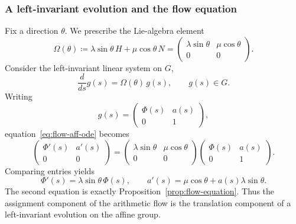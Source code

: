 \subsubsection*{A left-invariant evolution and the flow equation}
Fix a direction $\theta$. We prescribe the Lie-algebra element
\begin{equation}\label{eq:flow-omega}
\Omega(\theta)\coloneqq \lambda\sin\theta\,H+\mu\cos\theta\,N
=
\begin{pmatrix}
\lambda\sin\theta & \mu\cos\theta\\
0 & 0
\end{pmatrix}.
\end{equation}
Consider the left-invariant linear system on $G$,
\begin{equation}\label{eq:flow-aff-ode}
\frac{d}{ds}g(s)=\Omega(\theta)\,g(s),
\qquad g(s)\in G.
\end{equation}
Writing
\[
g(s)=
\begin{pmatrix}
\Phi(s) & a(s)\\
0 & 1
\end{pmatrix},
\]
equation~\eqref{eq:flow-aff-ode} becomes
\[
\begin{pmatrix}
\Phi'(s) & a'(s)\\
0 & 0
\end{pmatrix}
=
\begin{pmatrix}
\lambda\sin\theta & \mu\cos\theta\\
0 & 0
\end{pmatrix}
\begin{pmatrix}
\Phi(s) & a(s)\\
0 & 1
\end{pmatrix}.
\]
Comparing entries yields
\[
\Phi'(s)=\lambda\sin\theta\,\Phi(s),
\qquad
a'(s)=\mu\cos\theta+a(s)\lambda\sin\theta.
\]
The second equation is exactly Proposition~\ref{prop:flow-equation}. Thus the assignment component of the arithmetic flow is the translation component of a left-invariant evolution on the affine group.
